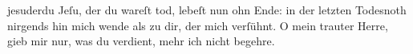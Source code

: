 \documentclass[tocstyle=ref-genre]{ees}
\begin{document}
{  \begin{movement}{jesuderdu}
    \voice[Coro]
    Jeſu, der du wareſt tod,
    lebeſt nun ohn Ende:
    in der letzten Todesnoth
    nirgends hin mich wende
    als zu dir, der mich verſühnt.
    O mein trauter Herre,
    gieb mir nur, was du verdient,
    mehr ich nicht begehre.
  \end{movement}

  \begin{movement}{}
    \voice[]
  \end{movement}

  \begin{movement}{}
    \voice[]
  \end{movement}

  \begin{movement}{}
    \voice[]
  \end{movement}

  \begin{movement}{}
    \voice[]
  \end{movement}

  \begin{movement}{}
    \voice[]
  \end{movement}

  \begin{movement}{}
    \voice[]
  \end{movement}
}

\eesScore
\end{document}
